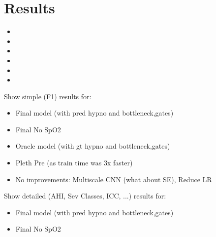 \chapter{Results \label{Chapter-Results}}

\begin{itemize}
    \item {} %
    \item {} %
    \item {} %
    \item {} %
    \item {} %
    \item {} %
\end{itemize}

Show simple (F1) results for:
\begin{itemize}
    \item Final model (with pred hypno and bottleneck,gates)
    \item Final No SpO2
    \item Oracle model (with gt hypno and bottleneck,gates)
    \item Pleth Pre (as train time was 3x faster)
    \item No improvements: Multiscale CNN (what about SE), Reduce LR
\end{itemize}

Show detailed (AHI, Sev Classes, ICC, ...) results for:
\begin{itemize}
    \item Final model (with pred hypno and bottleneck,gates)
    \item Final No SpO2
\end{itemize}

